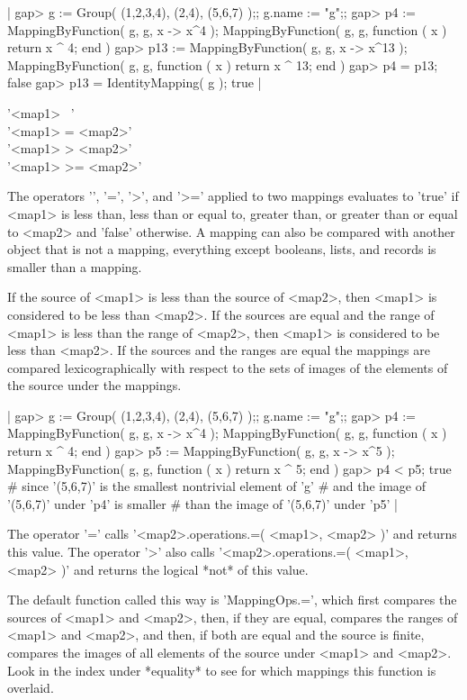 |    gap> g := Group( (1,2,3,4), (2,4), (5,6,7) );;  g.name := "g";;
    gap> p4 := MappingByFunction( g, g, x -> x^4 );
    MappingByFunction( g, g, function ( x )
        return x ^ 4;
    end )
    gap> p13 := MappingByFunction( g, g, x -> x^13 );
    MappingByFunction( g, g, function ( x )
        return x ^ 13;
    end )
    gap> p4 = p13;
    false
    gap> p13 = IdentityMapping( g );
    true |

'<map1> \<\ <map2>' \\
'<map1> \<= <map2>' \\
'<map1> >   <map2>' \\
'<map1> >=  <map2>'

The  operators  '\<', '\<=',  '>',  and  '>='  applied  to  two  mappings
evaluates to  'true'  if <map1>  is less than,  less  than  or equal  to,
greater than,  or greater  than or equal to <map2> and 'false' otherwise.
A mapping can also be compared with another object that is not a mapping,
everything except booleans, lists, and records is smaller than a mapping.

If the source of <map1> is less than the source of <map2>, then <map1> is
considered to be less  than <map2>.  If  the sources  are  equal  and the
range  of <map1> is less  than   the  range of   <map2>,  then <map1>  is
considered  to be less than  <map2>.  If the  sources and the ranges  are
equal the  mappings are compared lexicographically with   respect  to the
sets of images of the elements of the source under the mappings.

|    gap> g := Group( (1,2,3,4), (2,4), (5,6,7) );;  g.name := "g";;
    gap> p4 := MappingByFunction( g, g, x -> x^4 );
    MappingByFunction( g, g, function ( x )
        return x ^ 4;
    end )
    gap> p5 := MappingByFunction( g, g, x -> x^5 );
    MappingByFunction( g, g, function ( x )
        return x ^ 5;
    end )
    gap> p4 < p5;
    true    # since '(5,6,7)' is the smallest nontrivial element of 'g'
            # and the image of '(5,6,7)' under 'p4' is smaller
            # than the image of '(5,6,7)' under 'p5' |

The  operator  '=' calls  '<map2>.operations.=(  <map1>,  <map2>  )'  and
returns this value.  The operator '\<>' also calls  '<map2>.operations.=(
<map1>, <map2> )' and returns the logical *not* of this value.

The  default  function  called this  way is  'MappingOps.=', which  first
compares  the sources of  <map1> and  <map2>, then, if  they  are  equal,
compares the ranges of <map1> and <map2>, and then, if both are equal and
the source is finite, compares the images of all  elements of the  source
under <map1> and <map2>.  Look  in the index under *equality*  to see for
which mappings this function is overlaid.

